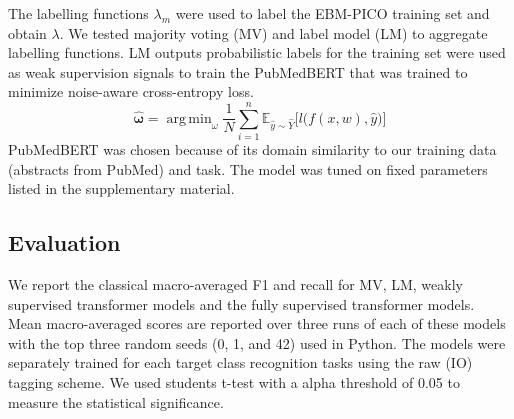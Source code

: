 \documentclass[10.7pt,]{article}
\DeclareMathOperator*{\argmin}{arg\,min}
\begin{document}
The labelling functions $\lambda_{m}$ were used to label the EBM-PICO training set and obtain $\lambda$. 
We tested majority voting (MV) and label model (LM) to aggregate labelling functions.
LM outputs probabilistic labels for the training set were used as weak supervision signals to train the PubMedBERT that was trained to minimize noise-aware cross-entropy loss.
%
\begin{equation}
\bm{\hat{\omega}} = \argmin_{\omega} \frac{1}{N} \sum_{i=1}^{n} \mathbb{ E }_{ \hat{y} \sim \hat{Y}} \big[ l \big( f(x, w), \hat{y} \big) \big]
\end{equation}
%
PubMedBERT was chosen because of its domain similarity to our training data (abstracts from PubMed) and task.
The model was tuned on fixed parameters listed in the supplementary material. 
%
%
%
\subsection{Evaluation}\label{eval}
%
We report the classical macro-averaged F1 and recall for MV, LM, weakly supervised transformer models and the fully supervised transformer models.
Mean macro-averaged scores are reported over three runs of each of these models with the top three random seeds (0, 1, and 42) used in Python.
The models were separately trained for each target class recognition tasks using the raw (IO) tagging scheme.
We used students t-test with a alpha threshold of 0.05 to measure the statistical significance.
%
%
%
\end{document}
